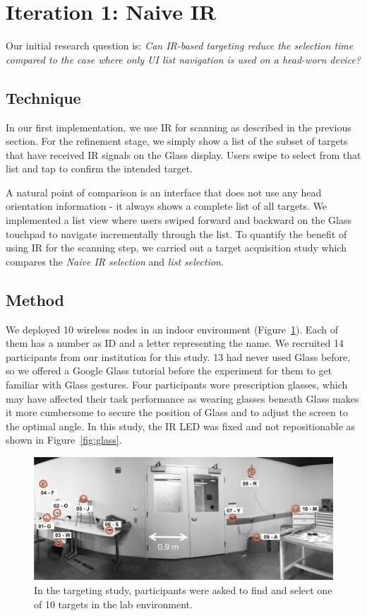 
\section{Iteration 1: Naive IR}
Our initial research question is: {\em Can IR-based targeting reduce the selection time compared to the case where only UI list navigation is used on a head-worn device?} 

\subsection{Technique}
In our first implementation, we use IR for scanning as described in the previous section. For the refinement stage, we simply show a list of the subset of targets that have received IR signals on the Glass display. Users swipe to select from that list and tap to confirm the intended target.

A natural point of comparison is an interface that does not use any head orientation information - it always shows a complete list of all targets. We implemented a list view where users swiped forward and backward on the Glass touchpad to navigate incrementally through the list. To quantify the benefit of using IR for the scanning step, we carried out a target acquisition study which compares the {\em Naive IR selection} and {\em list selection}.  

\subsection{Method}
We deployed 10 wireless nodes in an indoor environment (Figure~\ref{fig:targeting-study-layout}). Each of them has a number as ID and a letter representing the name. We recruited 14 participants from our institution for this study. 13 had never used Glass before, so we offered a Google Glass tutorial before the experiment for them to get familiar with Glass gestures. Four participants wore prescription glasses, which may have affected their task performance as wearing glasses beneath Glass makes it more cumbersome to secure the position of Glass and to adjust the screen to the optimal angle. In this study, the IR LED was fixed and not repositionable as shown in Figure~\ref{fig:glass}.

\begin{figure}[t]
\centering
\includegraphics[width=1.0\columnwidth]{figures/study-layout1.png}
\caption{In the targeting study, participants were asked to find and select one of 10 targets in the lab environment.}
\label{fig:targeting-study-layout}
\end{figure}

